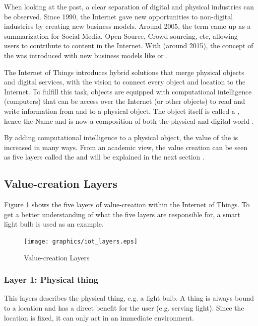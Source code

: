 When looking at the past, a clear separation of digital and physical industries can be observed. Since 1990, the Internet gave new opportunities to non-digital industries by creating new business models. Around 2005, the term  came up as a summarization for Social Media, Open Source, Crowd sourcing, etc, allowing users to contribute to content in the Internet. With  (around 2015), the concept of the  was introduced with new business models like  or \cite{iotfleisch}.

The Internet of Things introduces hybrid solutions that merge physical objects and digital services, with the vision to connect every object and location to the Internet. To fulfill this task, objects are equipped with computational intelligence (computers) that can be access over the Internet (or other objects) to read and write information from and to a physical object. The object itself is called a , hence the Name  and is now a composition of both the physical and digital world \cite{iotfleisch}.

By adding computational intelligence to a physical object, the value of the  is increased in many ways. From an academic view, the value creation can be seen as five layers called the  and will be explained in the next section \cite{iotfleisch}.

\subsection{Value-creation Layers}

Figure \ref{fig:value_creation_layers} shows the five layers of value-creation within the Internet of Things. To get a better understanding of what the five layers are responsible for, a smart light bulb is used as an example.

\begin{figure}[h]
	\centering
		\texttt{[image: graphics/iot\_layers.eps]}
	\caption{Value-creation Layers\cite{iotfleisch}}
	\label{fig:value_creation_layers}
\end{figure}

\subsubsection{Layer 1: Physical thing}
This layers describes the physical thing, e.g. a light bulb. A thing is always bound to a location and has a direct benefit for the user (e.g. serving light). Since the location is fixed, it can only act in an immediate environment.

